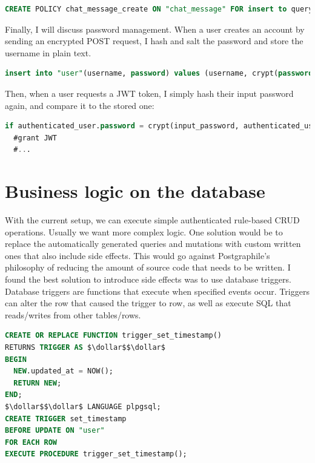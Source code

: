\documentclass{l4proj}
\begin{document}
\begin{lstlisting}[language=SQL, caption={Row level security policy only allowing a user send messages as themselves to their team}, ]
CREATE POLICY chat_message_create ON "chat_message" FOR insert to query_sender with check (username = (select username from active_user()) and groupName = (select groupName from active_user()));
\end{lstlisting}


Finally, I will discuss password management. When a user creates an account by sending an encrypted POST request, I hash and salt the password and store the username in plain text.

\begin{lstlisting}[language=SQL, caption={Hashing and salting done with pgcrypto}]
insert into "user"(username, password) values (username, crypt(password, gen_salt('bf')));
\end{lstlisting}

Then, when a user requests a JWT token, I simply hash their input password again, and compare it to the stored one:
\begin{lstlisting}[language=SQL, caption={Hashing and salting done with pgcrypto}]
if authenticated_user.password = crypt(input_password, authenticated_user.password) then
  #grant JWT
  #...
\end{lstlisting}

\section{Business logic on the database}
With the current setup, we can execute simple authenticated rule-based CRUD operations. Usually we want more complex logic. One solution would be to replace the automatically generated queries and mutations with custom written ones that also include side effects. This would go against Postgraphile's philosophy of reducing the amount of source code that needs to be written. I found the best solution to introduce side effects was to use database triggers. Database triggers are functions that execute when specified events occur. Triggers can alter the row that caused the trigger to row, as well as execute SQL that reads/writes from other tables/rows. 


\begin{lstlisting}[language=SQL, caption={Definition of a trigger function which sets the rows' "updated\_at" column to be the current time, and a trigger which calls the function on a user whenever the user is updated.}]
CREATE OR REPLACE FUNCTION trigger_set_timestamp()
RETURNS TRIGGER AS $\dollar$$\dollar$ 
BEGIN
  NEW.updated_at = NOW();
  RETURN NEW;
END;
$\dollar$$\dollar$ LANGUAGE plpgsql;
CREATE TRIGGER set_timestamp
BEFORE UPDATE ON "user"
FOR EACH ROW
EXECUTE PROCEDURE trigger_set_timestamp();
\end{lstlisting}
\end{document}
